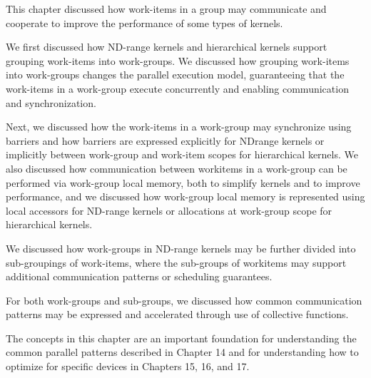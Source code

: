 This chapter discussed how work-items in a group may communicate and cooperate to improve the performance of some types of kernels.\par

We first discussed how ND-range kernels and hierarchical kernels support grouping work-items into work-groups. We discussed how grouping work-items into work-groups changes the parallel execution model, guaranteeing that the work-items in a work-group execute concurrently and enabling communication and synchronization.\par

Next, we discussed how the work-items in a work-group may synchronize using barriers and how barriers are expressed explicitly for NDrange kernels or implicitly between work-group and work-item scopes for hierarchical kernels. We also discussed how communication between workitems in a work-group can be performed via work-group local memory, both to simplify kernels and to improve performance, and we discussed how work-group local memory is represented using local accessors for ND-range kernels or allocations at work-group scope for hierarchical kernels.\par

We discussed how work-groups in ND-range kernels may be further divided into sub-groupings of work-items, where the sub-groups of workitems may support additional communication patterns or scheduling guarantees.\par

For both work-groups and sub-groups, we discussed how common communication patterns may be expressed and accelerated through use of collective functions.\par

The concepts in this chapter are an important foundation for understanding the common parallel patterns described in Chapter 14 and for understanding how to optimize for specific devices in Chapters 15, 16, and 17.\par


\newpage